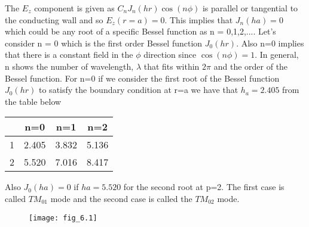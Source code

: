 	  The $E_z$ component is given as $C_nJ_n(hr)\cos(n\phi)$ is parallel or tangential to the conducting wall and so $E_z(r=a)=0$. This implies that $J_n(ha)=0$ which could be any root of a specific Bessel function as n {=} 0,1,2,.... Let's consider n = 0 which is the first order Bessel function $J_0(hr)$. Also n=0 implies that there is a constant field in the $\phi$ direction since $\cos(n\phi)=1$. In general, n shows the number of wavelength, $\lambda$ that fits within $2\pi$ and the order of the Bessel function. For n=0 if we consider the first root of the Bessel function $J_0(hr)$ to satisfy the boundary condition at r=a we have that $h_a = 2.405$ from the table below
	     \begin{center}
	     	\begin{tabular}{| c | c c c |}
	     		\hline
	     		\backslashbox{p}{n} &n{=}0 &n{=}1 &n{=}2 \\
	     		\hline
	     		1 &2.405 &3.832 &5.136 \\
	     		2 &5.520 &7.016 &8.417 \\
	     		\hline
	     	\end{tabular}
	     \end{center}
	     
 
      Also $J_0(ha)=0$ if $ha=5.520$ for the second root at p=2. The first case is called $TM_{01}$ mode and the second case is called the $TM_{02}$ mode.
      
      \begin{figure}[H]
      	\centering
      	\texttt{[image: fig\_6.1]}
      	\caption{}
      	\label{fig:fig6}
      \end{figure}
      
